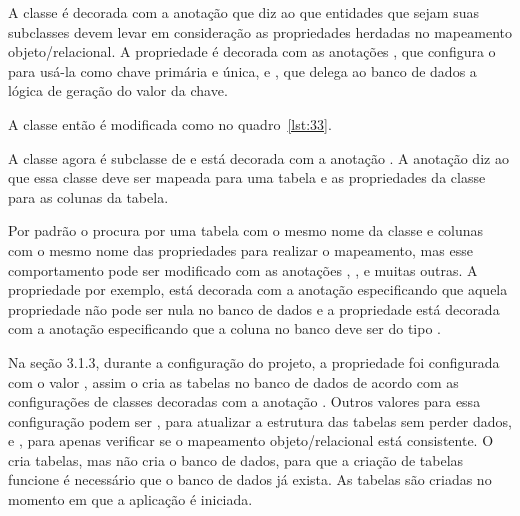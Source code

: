 
A classe  é decorada com a anotação  que diz ao  que entidades que sejam suas subclasses devem levar em consideração as propriedades herdadas no mapeamento objeto/relacional. A propriedade  é decorada com as anotações , que configura o  para usá-la como chave primária e única, e , que delega ao banco de dados a lógica de geração do valor da chave.

A classe  então é modificada como no quadro~\ref{lst:33}.


A classe  agora é subclasse de  e está decorada com a anotação . A anotação  diz ao  que essa classe deve ser mapeada para uma tabela e as propriedades da classe para as colunas da tabela.

Por padrão o  procura por uma tabela com o mesmo nome da classe e colunas com o mesmo nome das propriedades para realizar o mapeamento, mas esse comportamento pode ser modificado com as anotações , ,  e muitas outras. A propriedade  por exemplo, está decorada com a anotação  especificando que aquela propriedade não pode ser nula no banco de dados e a propriedade  está decorada com a anotação  especificando que a coluna no banco deve ser do tipo .

Na seção 3.1.3, durante a configuração do projeto, a propriedade  foi configurada com o valor , assim o  cria as tabelas no banco de dados de acordo com as configurações de classes decoradas com a anotação . Outros valores para essa configuração podem ser , para atualizar a estrutura das tabelas sem perder dados, e , para apenas verificar se o mapeamento objeto/relacional está consistente. O  cria tabelas, mas não cria o banco de dados, para que a criação de tabelas funcione é necessário que o banco de dados já exista. As tabelas são criadas no momento em que a aplicação é iniciada.

